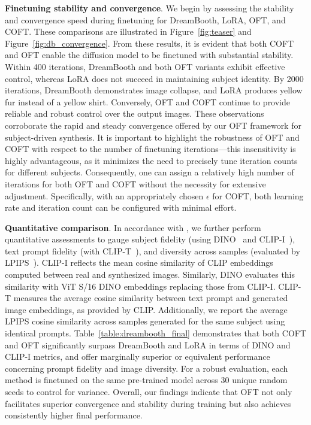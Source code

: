 {\textbf{Finetuning stability and convergence}. We begin by assessing the stability and convergence speed during finetuning for DreamBooth, LoRA, OFT, and COFT. These comparisons are illustrated in Figure~\ref{fig:teaser} and Figure~\ref{fig:db_convergence}. From these results, it is evident that both COFT and OFT enable the diffusion model to be finetuned with substantial stability. Within 400 iterations, DreamBooth and both OFT variants exhibit effective control, whereas LoRA does not succeed in maintaining subject identity. By 2000 iterations, DreamBooth demonstrates image collapse, and LoRA produces yellow fur instead of a yellow shirt. Conversely, OFT and COFT continue to provide reliable and robust control over the output images. These observations corroborate the rapid and steady convergence offered by our OFT framework for subject-driven synthesis. It is important to highlight the robustness of OFT and COFT with respect to the number of finetuning iterations—this insensitivity is highly advantageous, as it minimizes the need to precisely tune iteration counts for different subjects. Consequently, one can assign a relatively high number of iterations for both OFT and COFT without the necessity for extensive adjustment. Specifically, with an appropriately chosen $\epsilon$ for COFT, both learning rate and iteration count can be configured with minimal effort.

\textbf{Quantitative comparison}. In accordance with \cite{ruiz2023dreambooth}, we further perform quantitative assessments to gauge subject fidelity (using DINO~\cite{caron2021emerging} and CLIP-I~\cite{radford2021learning}), text prompt fidelity (with CLIP-T~\cite{radford2021learning}), and diversity across samples (evaluated by LPIPS~\cite{zhang2018unreasonable}). CLIP-I reflects the mean cosine similarity of CLIP embeddings computed between real and synthesized images. Similarly, DINO evaluates this similarity with ViT S/16 DINO embeddings replacing those from CLIP-I. CLIP-T measures the average cosine similarity between text prompt and generated image embeddings, as provided by CLIP. Additionally, we report the average LPIPS cosine similarity across samples generated for the same subject using identical prompts. Table~\ref{table:dreambooth_final} demonstrates that both COFT and OFT significantly surpass DreamBooth and LoRA in terms of DINO and CLIP-I metrics, and offer marginally superior or equivalent performance concerning prompt fidelity and image diversity. For a robust evaluation, each method is finetuned on the same pre-trained model across 30 unique random seeds to control for variance. Overall, our findings indicate that OFT not only facilitates superior convergence and stability during training but also achieves consistently higher final performance.

}
